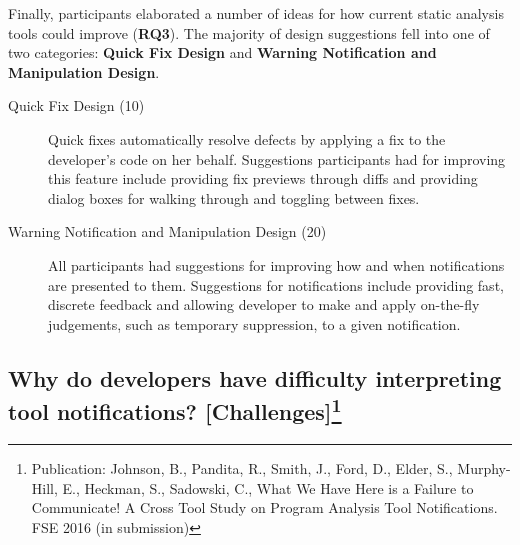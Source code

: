 \documentclass{llncs}
\begin{document}
Finally, participants elaborated a number of ideas for how current static analysis tools could improve (\textbf{RQ3}). 
The majority of design suggestions fell into one of two categories: \textbf{Quick Fix Design} and \textbf{Warning Notification and Manipulation Design}.
\begin{description}
	\item[Quick Fix Design (10)] Quick fixes automatically resolve defects by applying a fix to the developer's code on her behalf. Suggestions participants had for improving this feature include providing fix previews through diffs and providing dialog boxes for walking through and toggling between fixes. 
	\item [Warning Notification and Manipulation Design (20)] All participants had suggestions for improving how and when notifications are presented to them. Suggestions for notifications include providing fast, discrete feedback and allowing developer to make and apply on-the-fly judgements, such as temporary suppression, to a given notification. 
\end{description}



\subsection{Why do developers have difficulty interpreting tool notifications? [Challenges]\protect\footnote{Publication: Johnson, B., Pandita, R., Smith, J., Ford, D., Elder, S., Murphy-Hill, E., Heckman, S., Sadowski, C., What We Have Here is a Failure to Communicate! A Cross Tool Study on Program Analysis Tool Notifications. FSE 2016 (in submission)}}\label{subsec:s2}
\end{document}
